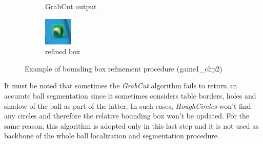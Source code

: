\begin{figure}[h!]
\begin{subfigure}[b]{0.25\textwidth}
        \caption{GrabCut output}
    \end{subfigure}
    \hspace{0.05\textwidth}
    \begin{subfigure}[b]{0.25\textwidth}
        \centering
        \includegraphics[width=\textwidth]{imgs/ball_localization/bbox_after.jpg}
        \caption{refined box}
    \end{subfigure}
    \caption{Example of bounding box refinement procedure (game1\_clip2)}
    \label{fig:refine}
\end{figure}
It must be noted that sometimes the \textit{GrabCut} algorithm fails to return an accurate ball segmentation since it sometimes considers table borders, holes and shadow of the ball as part of the latter.
In such cases, \textit{HoughCircles} won't find any circles and therefore the relative bounding box won't be updated.
For the same reason, this algorithm is adopted only in this last step and it is not used as backbone of the whole ball localization and segmentation procedure.